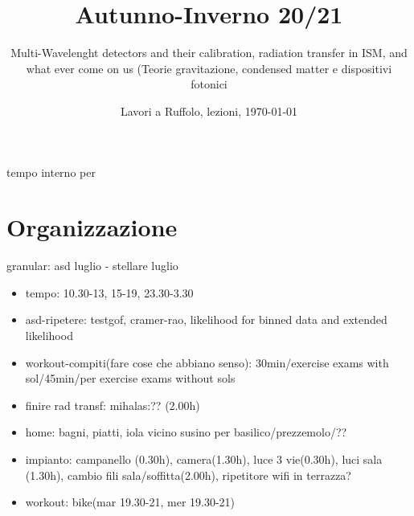 \documentclass[10pt,xcolor={usenames},fleqn,mathserif,serif]{beamer}
\title{Autunno-Inverno 20/21}
\subtitle{Multi-Wavelenght detectors and their calibration, radiation transfer in ISM, and what ever come on us (Teorie gravitazione, condensed matter e dispositivi fotonici}
\date{Lavori a Ruffolo, lezioni, \today}
\begin{document}


\begin{frame}
  \titlepage
\end{frame}

\begin{frame}{tempo interno per}
\tableofcontents[onlyparts]
\end{frame}


\part{Organizzazione}

\begin{frame}{granular: asd luglio - stellare luglio}
    \begin{itemize}
        \item tempo: 10.30-13, 15-19, 23.30-3.30
        \item asd-ripetere: testgof, cramer-rao, likelihood for binned data and extended likelihood
        \item workout-compiti(fare cose che abbiano senso): 30min/exercise exams with sol/45min/per exercise exams without sols
        \item finire rad transf: mihalas:?? (2.00h)
        \item home: bagni, piatti, iola vicino susino per basilico/prezzemolo/??
        \item impianto: campanello (0.30h), camera(1.30h), luce 3 vie(0.30h), luci sala (1.30h), cambio fili sala/soffitta(2.00h), ripetitore wifi in terrazza?
        \item workout: bike(mar 19.30-21, mer 19.30-21)
    \end{itemize}
\end{frame}
\end{document}

